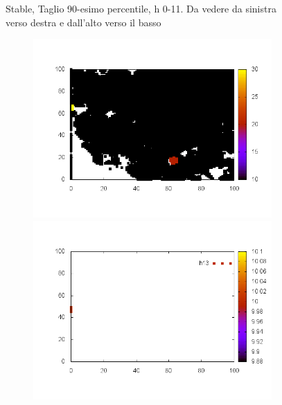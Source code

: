 \documentclass[10pt,a4paper]{article}
\begin{document}
\begin{figure}
\begin{subfigure}[b]{1\textwidth}
\end{subfigure}
\caption{Stable, Taglio 90-esimo percentile, h 0-11. Da vedere da sinistra verso destra e dall'alto verso il basso}
\end{figure}

\begin{figure}
\centering

\begin{subfigure}[b]{1\textwidth}
\includegraphics[scale=.3]{./img/SCC_Stable3/cut90p/12.png}
\includegraphics[scale=.3]{./img/SCC_Stable3/cut90p/13.png}

\end{subfigure}
\end{figure}
\end{document}
